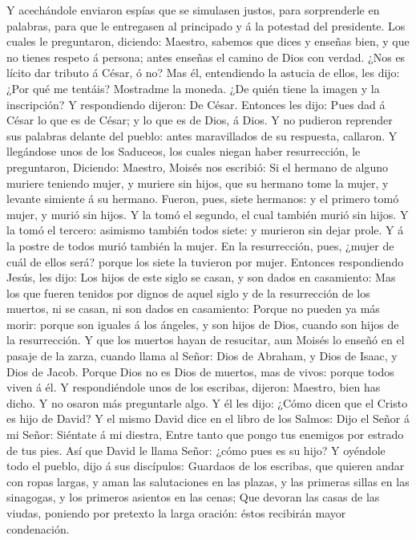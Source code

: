 Y acechándole enviaron espías que se simulasen justos, para sorprenderle
en palabras, para que le entregasen al principado y á la potestad del
presidente.  Los cuales le preguntaron, diciendo:
Maestro, sabemos que dices y enseñas bien, y que no tienes respeto á
persona; antes enseñas el camino de Dios con verdad. 
¿Nos es lícito dar tributo á César, ó no?  Mas él,
entendiendo la astucia de ellos, les dijo: ¿Por qué me tentáis?
 Mostradme la moneda. ¿De quién tiene la imagen y la
inscripción? Y respondiendo dijeron: De César.  Entonces
les dijo: Pues dad á César lo que es de César; y lo que es de Dios, á
Dios.  Y no pudieron reprender sus palabras delante del
pueblo: antes maravillados de su respuesta, callaron.  Y
llegándose unos de los Saduceos, los cuales niegan haber resurrección,
le preguntaron,  Diciendo: Maestro, Moisés nos escribió:
Si el hermano de alguno muriere teniendo mujer, y muriere sin hijos, que
su hermano tome la mujer, y levante simiente á su hermano.
 Fueron, pues, siete hermanos: y el primero tomó mujer, y
murió sin hijos.  Y la tomó el segundo, el cual también
murió sin hijos.  Y la tomó el tercero: asimismo también
todos siete: y murieron sin dejar prole.  Y á la postre
de todos murió también la mujer.  En la resurrección,
pues, ¿mujer de cuál de ellos será? porque los siete la tuvieron por
mujer.  Entonces respondiendo Jesús, les dijo: Los hijos
de este siglo se casan, y son dados en casamiento:  Mas
los que fueren tenidos por dignos de aquel siglo y de la resurrección de
los muertos, ni se casan, ni son dados en casamiento: 
Porque no pueden ya más morir: porque son iguales á los ángeles, y son
hijos de Dios, cuando son hijos de la resurrección.  Y
que los muertos hayan de resucitar, aun Moisés lo enseñó en el pasaje de
la zarza, cuando llama al Señor: Dios de Abraham, y Dios de Isaac, y
Dios de Jacob.  Porque Dios no es Dios de muertos, mas de
vivos: porque todos viven á él.  Y respondiéndole unos de
los escribas, dijeron: Maestro, bien has dicho.  Y no
osaron más preguntarle algo.  Y él les dijo: ¿Cómo dicen
que el Cristo es hijo de David?  Y el mismo David dice en
el libro de los Salmos: Dijo el Señor á mi Señor: Siéntate á mi diestra,
 Entre tanto que pongo tus enemigos por estrado de tus
pies.  Así que David le llama Señor: ¿cómo pues es su
hijo?  Y oyéndole todo el pueblo, dijo á sus discípulos:
 Guardaos de los escribas, que quieren andar con ropas
largas, y aman las salutaciones en las plazas, y las primeras sillas en
las sinagogas, y los primeros asientos en las cenas;  Que
devoran las casas de las viudas, poniendo por pretexto la larga oración:
éstos recibirán mayor condenación.

